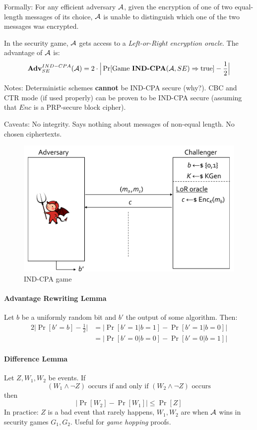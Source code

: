 Formally:
For any efficient adversary $\mathcal{A}$, given the encryption of one of two equal-length messages of its choice,
$\mathcal{A}$ is unable to distinguish which one of the two messages was encrypted.

In the security game, $\mathcal{A}$ gets access to a \emph{Left-or-Right encryption oracle}.
The advantage of $\mathcal{A}$ is:
$$
\mathbf{Adv}^{IND-CPA}_{SE} (\mathcal{A})
= 2 \cdot \Big| \Pr[ \text{Game }\textbf{IND-CPA}(\mathcal{A}, SE) \Rightarrow \text{true} ] - \frac{1}{2} \Big|
$$

Notes:
Deterministic schemes \textbf{cannot} be IND-CPA secure (why?).
CBC and CTR mode (if used properly) can be proven to be IND-CPA secure (assuming that $Enc$ is a PRP-secure block cipher).

Caveats:
No integrity. Says nothing about messages of non-equal length. No chosen ciphertexts.

\begin{figure}[h]
    \centering
	\includegraphics[scale=0.4]{images/ind-cpa.png}
    \caption{IND-CPA game}
    \label{fig:ind-cpa}
\end{figure}

\paragraph{Advantage Rewriting Lemma}\label{adv-rewr-lemm}
Let $b$ be a uniformly random bit and $b'$ the output of some algorithm. Then:
\begin{align*}
2 \Big| \Pr[b'=b] - \frac{1}{2} \Big|
&= \Big| \Pr[b'=1|b=1] - \Pr[b'=1|b=0] \Big| \\
&= \Big| \Pr[b'=0|b=0] - \Pr[b'=0|b=1] \Big|
\end{align*}

\paragraph{Difference Lemma}
Let $Z, W_1, W_2$ be events. If
$$
(W_1 \wedge \neg Z) \text{ occurs if and only if } (W_2 \wedge \neg Z) \text{ occurs}
$$
then
$$
\Big| \Pr[W_2] - \Pr[W_1] \Big| \leq \Pr[Z]
$$
In practice: $Z$ is a bad event that rarely happens, $W_1, W_2$ are when $\mathcal{A}$ wins in security games $G_1, G_2$.
Useful for \emph{game hopping} proofs.


